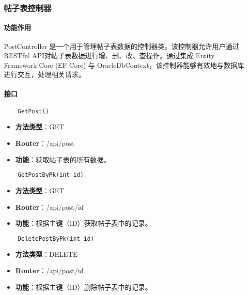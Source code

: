 \subsubsection{帖子表控制器}

\paragraph{功能作用}

PostController 是一个用于管理帖子表数据的控制器类。该控制器允许用户通过RESTful API对帖子表数据进行增、删、改、查操作。通过集成 Entity Framework Core (EF Core) 与 OracleDbContext，该控制器能够有效地与数据库进行交互，处理相关请求。

\paragraph{接口}

\begin{verbatim}
	GetPost()
\end{verbatim}

\begin{itemize}
	\item \textbf{方法类型}：GET
	\item \textbf{Router}：/api/post
	\item \textbf{功能}：获取帖子表的所有数据。
\end{itemize}

\begin{verbatim}
	GetPostByPk(int id)
\end{verbatim}

\begin{itemize}
	\item \textbf{方法类型}：GET
	\item \textbf{Router}：/api/post/{id}
	\item \textbf{功能}：根据主键（ID）获取帖子表中的记录。
\end{itemize}

\begin{verbatim}
	DeletePostByPk(int id)
\end{verbatim}

\begin{itemize}
	\item \textbf{方法类型}：DELETE
	\item \textbf{Router}：/api/post/{id}
	\item \textbf{功能}：根据主键（ID）删除帖子表中的记录。
\end{itemize}

